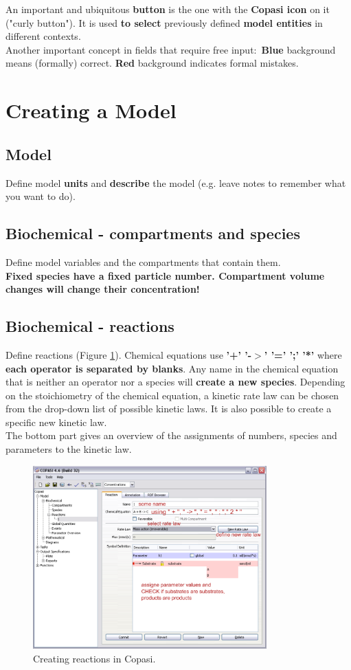 \documentclass[a4paper,11pt,twoside]{article}
\begin{document}
An important and ubiquitous \textbf{button} is the one with the \textbf{Copasi icon} on it ("curly button"). It is used \textbf{to select} previously defined \textbf{model entities} in different contexts.\\
Another important  concept in fields that  require free input:~{\color{blue}\textbf{Blue}} background  means (formally) correct.{ \color{red}\textbf{Red}} background indicates formal mistakes.


\section{Creating a Model}
\subsection{Model}
\label{sub:Model}
Define  model  \textbf{units}  and \textbf{describe}  the  model (e.g. leave notes to remember what you want to do).
\subsection{Biochemical - compartments and species}
\label{sub:Biochem1}
Define model variables and the compartments that contain them.\\
\textbf{Fixed species have a fixed particle number. Compartment volume changes will change their concentration!}
\subsection{Biochemical - reactions}
\label{sub:Biochem2}
Define reactions (Figure \ref{fig:Reactions}).  Chemical equations use \textbf{'+' '-$>$' '=' ';' '*' } where \textbf{each operator is separated by blanks}. Any name in the chemical equation that is neither an operator nor a species will \textbf{create a new species}. Depending on the stoichiometry of the chemical equation, a kinetic rate law can be chosen from the drop-down list of possible kinetic laws. It is also possible to create a specific new kinetic law.\\
The bottom part gives an overview of the assignments of numbers, species and parameters to the kinetic law.

\begin{figure}[htb]
 \centering
 \includegraphics[width=09cm]{Pictures/CopasiReactions2.pdf}
 \caption{\footnotesize Creating reactions in Copasi.}
 \label{fig:Reactions}
\end{figure}
\end{document}
